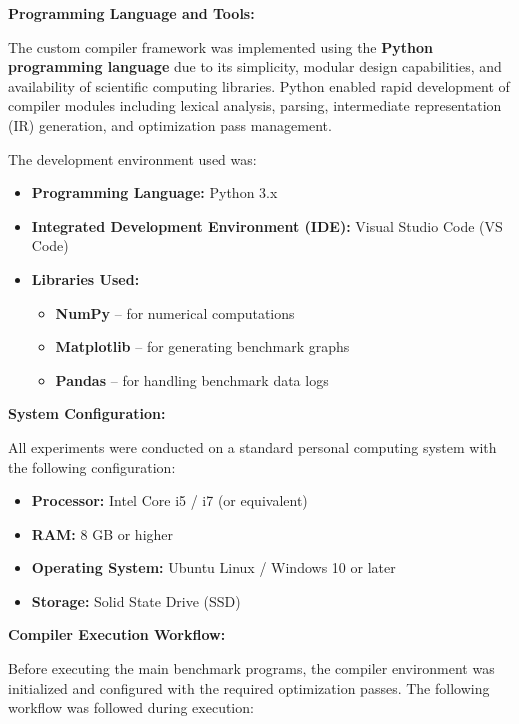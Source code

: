 \documentclass[conference]{IEEEtran}
\begin{document}
\textbf{Programming Language and Tools:}

The custom compiler framework was implemented using the \textbf{Python programming language} due to its simplicity, modular design capabilities, and availability of scientific computing libraries. Python enabled rapid development of compiler modules including lexical analysis, parsing, intermediate representation (IR) generation, and optimization pass management.

The development environment used was:

\begin{itemize}

\item \textbf{Programming Language:} Python 3.x  
\item \textbf{Integrated Development Environment (IDE):} Visual Studio Code (VS Code)  
\item \textbf{Libraries Used:}
    \begin{itemize}
        \item \textbf{NumPy} – for numerical computations
        \item \textbf{Matplotlib} – for generating benchmark graphs
        \item \textbf{Pandas} – for handling benchmark data logs
    \end{itemize}

\end{itemize}

\textbf{System Configuration:}

All experiments were conducted on a standard personal computing system with the following configuration:

\begin{itemize}

\item \textbf{Processor:} Intel Core i5 / i7 (or equivalent)
\item \textbf{RAM:} 8 GB or higher
\item \textbf{Operating System:} Ubuntu Linux / Windows 10 or later
\item \textbf{Storage:} Solid State Drive (SSD)

\end{itemize}

\textbf{Compiler Execution Workflow:}

Before executing the main benchmark programs, the compiler environment was initialized and configured with the required optimization passes. The following workflow was followed during execution:
\end{document}
